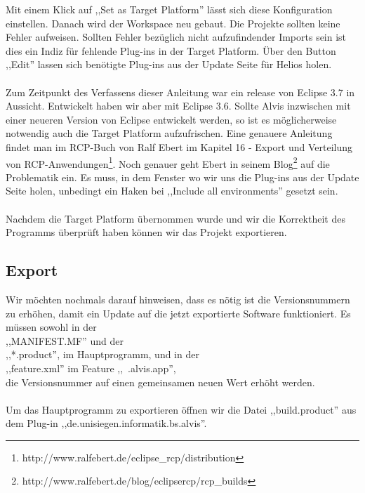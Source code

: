 \documentclass[10pt,a4paper,oneside]{scrbook}
\begin{document}
Mit einem Klick auf ,,Set as Target Platform'' lässt sich diese Konfiguration einstellen. 
Danach wird der Workspace neu gebaut. Die Projekte sollten keine Fehler aufweisen. Sollten Fehler bezüglich nicht aufzufindender Imports sein ist dies ein Indiz für fehlende Plug-ins in der Target Platform. Über den Button ,,Edit'' lassen sich benötigte Plug-ins aus der Update Seite für Helios holen.
\\ \\
Zum Zeitpunkt des Verfassens dieser Anleitung war ein release von Eclipse 3.7 in Aussicht. Entwickelt haben wir aber  mit Eclipse 3.6. Sollte Alvis inzwischen mit einer neueren Version von Eclipse entwickelt werden, so ist es möglicherweise notwendig auch die Target Platform aufzufrischen. Eine genauere Anleitung findet man im RCP-Buch von Ralf Ebert im Kapitel 16 - Export und Verteilung von RCP-Anwendungen\footnote{http://www.ralfebert.de/eclipse\_rcp/distribution\/}. Noch genauer geht Ebert in seinem Blog\footnote{http://www.ralfebert.de/blog/eclipsercp/rcp\_builds\/} auf die Problematik ein. Es muss, in dem Fenster wo wir uns die Plug-ins aus der Update Seite holen, unbedingt ein Haken bei ,,Include all environments'' gesetzt sein.
\\ \\

Nachdem die Target Platform übernommen wurde und wir die Korrektheit des Programms überprüft haben können wir das Projekt exportieren. 
\subsection{Export}
Wir möchten nochmals darauf hinweisen, dass es nötig ist die Versionsnummern zu erhöhen, damit ein Update auf die jetzt exportierte Software funktioniert. Es müssen sowohl in der \\
,,MANIFEST.MF'' und der \\
,,*.product'', im Hauptprogramm, und in der \\
,,feature.xml'' im Feature ,,~.alvis.app'', \\
die Versionsnummer auf einen gemeinsamen neuen Wert erhöht werden.
\\ \\
Um das Hauptprogramm zu exportieren öffnen wir die Datei ,,build.product'' aus dem Plug-in ,,de.unisiegen.informatik.bs.alvis''.

\begin{center}
\end{center}
\end{document}
